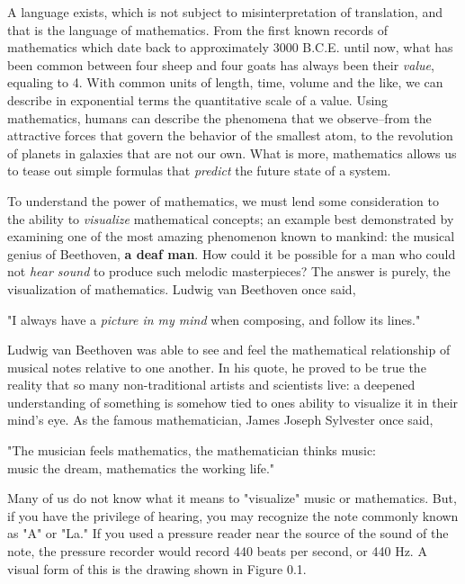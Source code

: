 \documentclass[12pt]{ucsddissertation}
\begin{document}
\begin{dissertationintroduction}
A language exists, which is not subject to misinterpretation of translation, and that is the language of mathematics. From the first known records of mathematics which date back to approximately 3000 B.C.E. until now, what has been common between four sheep and four goats has always been their \textit{value}, equaling to 4. With common units of length, time, volume and the like, we can describe in exponential terms the quantitative scale of a value. Using mathematics, humans can describe the phenomena that we observe--from the attractive forces that govern the behavior of the smallest atom, to the revolution of planets in galaxies that are not our own. What is more, mathematics allows us to tease out simple formulas that \textit{predict} the future state of a system. 

To understand the power of mathematics, we must lend some consideration to the ability to \textit{visualize} mathematical concepts; an example best demonstrated by examining one of the most amazing phenomenon known to mankind: the musical genius of Beethoven, \textbf{a deaf man}. How could it be possible for a man who could not \textit{\textit{hear sound}} to produce such melodic masterpieces? The answer is purely, the visualization of mathematics. Ludwig van Beethoven once said, 

\begin{center}
    "I always have a \textit{picture in my mind} when composing, and follow its lines."
\end{center}

Ludwig van Beethoven was able to see and feel the mathematical relationship of musical notes relative to one another.  In his quote, he proved to be true the reality that so many non-traditional artists and scientists live: a deepened understanding of something is somehow tied to ones ability to visualize it in their mind's eye. As the famous mathematician, James Joseph Sylvester once said, 

\begin{center}
    "The musician feels mathematics, the mathematician thinks music: \\ music the dream, mathematics the working life."
\end{center}

Many of us do not know what it means to "visualize" music or mathematics. But, if you have the privilege of hearing, you may recognize the note commonly known as "A" or "La." If you used a pressure reader near the source of the sound of the note, the pressure recorder would record 440 beats per second, or 440 Hz. A visual form of this is the drawing shown in Figure 0.1. 



\end{dissertationintroduction}
\end{document}
